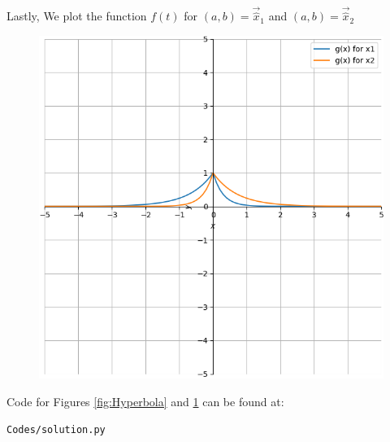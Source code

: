 \documentclass[journal]{IEEEtran}
\begin{document}
Lastly, We plot the function $f(t)$ for $(a, b) = \vec{\hat{x}}_1$ and $(a, b) = \vec{\hat{x}}_2$

\begin{figure}[H]
	\centering
	\includegraphics[width=0.75\columnwidth]{Figures/function.png} 
	\caption{}
	\label{fig:Function}
\end{figure} 

Code for Figures \ref{fig:Hyperbola} and \ref{fig:Function} can be found at:
\begin{lstlisting}
Codes/solution.py
\end{lstlisting}
\end{document}
